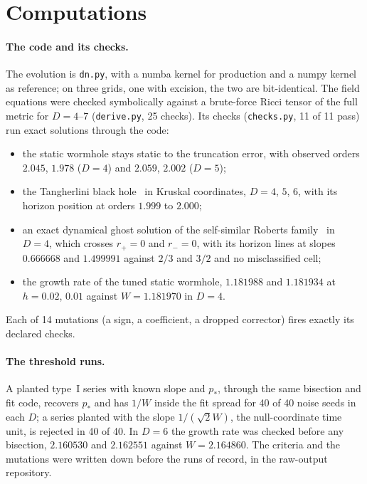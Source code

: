 \documentclass[11pt]{article}
\begin{document}
\section{Computations}\label{sec:computations}

\paragraph{The code and its checks.} The evolution is \texttt{dn.py}, with a numba kernel for production and a numpy
kernel as reference; on three grids, one with excision, the two are bit-identical. The field equations were checked
symbolically against a brute-force Ricci tensor of the full metric for $D=4$--$7$ (\texttt{derive.py}, 25 checks). Its
checks (\texttt{checks.py}, 11 of 11 pass) run exact solutions through the code:
\begin{itemize}
\item the static wormhole stays static to the truncation error, with observed orders $2.045$, $1.978$ ($D=4$) and
$2.059$, $2.002$ ($D=5$);
\item the Tangherlini black hole~\cite{Tangherlini1963} in Kruskal coordinates, $D=4$, $5$, $6$, with its horizon
position at orders $1.999$ to $2.000$;
\item an exact dynamical ghost solution of the self-similar Roberts family~\cite{Roberts1989,Maeda2009} in $D=4$, which
crosses $r_+=0$ and $r_-=0$, with its horizon lines at slopes $0.666668$ and $1.499991$ against $2/3$ and $3/2$ and no
misclassified cell;
\item the growth rate of the tuned static wormhole, $1.181988$ and $1.181934$ at $h=0.02$, $0.01$ against $W=1.181970$
in $D=4$.
\end{itemize}
Each of 14 mutations (a sign, a coefficient, a dropped corrector) fires exactly its declared checks.

\paragraph{The threshold runs.} A planted type~I series with known slope and $p_*$, through the same bisection and fit
code, recovers $p_*$ and has $1/W$ inside the fit spread for 40 of 40 noise seeds in each $D$; a series planted with
the slope $1/(\sqrt2W)$, the null-coordinate time unit, is rejected in 40 of 40. In $D=6$ the growth rate was checked
before any bisection, $2.160530$ and $2.162551$ against $W=2.164860$. The criteria and the mutations were written down
before the runs of record, in the raw-output repository.
\end{document}
